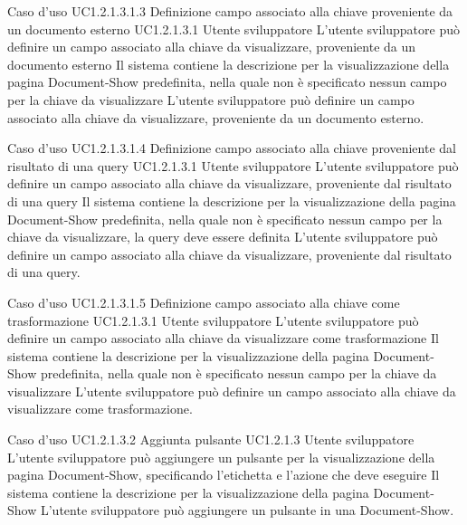 \UCtitle
{Caso d'uso UC1.2.1.3.1.3}
{Definizione campo associato alla chiave proveniente da un documento esterno}
\UC
{UC1.2.1.3.1}
{Utente sviluppatore}
{L'utente sviluppatore può definire un campo associato alla chiave da visualizzare, proveniente da un documento esterno}
{Il sistema contiene la descrizione per la visualizzazione della pagina Document-Show predefinita, nella quale non è specificato nessun campo per la chiave da visualizzare}
\scenario
{L'utente sviluppatore può definire un campo associato alla chiave da visualizzare, proveniente da un documento esterno.}

\UCtitle
{Caso d'uso UC1.2.1.3.1.4}
{Definizione campo associato alla chiave proveniente dal risultato di una query}
\UC
{UC1.2.1.3.1}
{Utente sviluppatore}
{L'utente sviluppatore può definire un campo associato alla chiave da visualizzare, proveniente dal risultato di una query}
{Il sistema contiene la descrizione per la visualizzazione della pagina Document-Show predefinita, nella quale non è specificato nessun campo per la chiave da visualizzare, la query deve essere definita}
\scenario
{L'utente sviluppatore può definire un campo associato alla chiave da visualizzare, proveniente dal risultato di una query.}

\UCtitle
{Caso d'uso UC1.2.1.3.1.5}
{Definizione campo associato alla chiave come trasformazione}
\UC
{UC1.2.1.3.1}
{Utente sviluppatore}
{L'utente sviluppatore può definire un campo associato alla chiave da visualizzare come trasformazione}
{Il sistema contiene la descrizione per la visualizzazione della pagina Document-Show predefinita, nella quale non è specificato nessun campo per la chiave da visualizzare}
\scenario
{L'utente sviluppatore può definire un campo associato alla chiave da visualizzare come trasformazione.}

\UCtitle
{Caso d'uso UC1.2.1.3.2}
{Aggiunta pulsante}
\UC
{UC1.2.1.3}
{Utente sviluppatore}
{L'utente sviluppatore può aggiungere un pulsante per la visualizzazione della pagina Document-Show, specificando l'etichetta e l'azione che deve eseguire}
{Il sistema contiene la descrizione per la visualizzazione della pagina Document-Show}
\scenario
{L'utente sviluppatore può aggiungere un pulsante in una Document-Show.}

